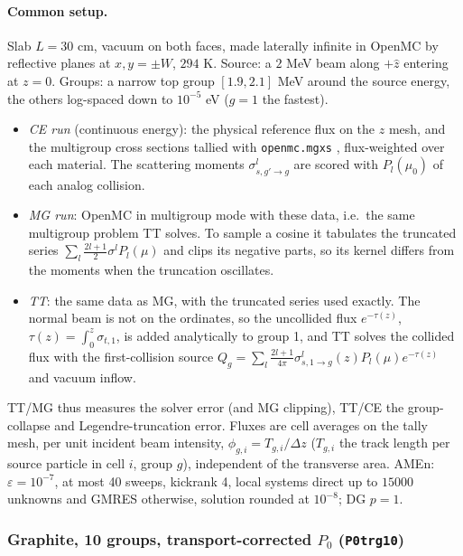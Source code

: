 \documentclass[11pt,a4paper]{article}
\newcommand{\code}[1]{\texttt{#1}}
\begin{document}
\paragraph{Common setup.} Slab $L=30$ cm, vacuum on both faces, made laterally infinite in OpenMC by reflective planes at $x,y=\pm W$, $294$ K. Source: a $2$ MeV beam along $+\hat z$ entering at $z=0$. Groups: a narrow top group $[1.9,2.1]$ MeV around the source energy, the others log-spaced down to $10^{-5}$ eV ($g=1$ the fastest).
\begin{itemize}[nosep]
\item \emph{CE run} (continuous energy): the physical reference flux on the $z$ mesh, and the multigroup cross sections tallied with \code{openmc.mgxs} \cite{MGXS}, flux-weighted over each material. The scattering moments $\sigma^l_{s,g'\to g}$ are scored with $P_l(\mu_0)$ of each analog collision.
\item \emph{MG run}: OpenMC in multigroup mode with these data, i.e.\ the same multigroup problem TT solves. To sample a cosine it tabulates the truncated series $\sum_l\frac{2l+1}{2}\sigma^lP_l(\mu)$ and clips its negative parts, so its kernel differs from the moments when the truncation oscillates.
\item \emph{TT}: the same data as MG, with the truncated series used exactly. The normal beam is not on the ordinates, so the uncollided flux $e^{-\tau(z)}$, $\tau(z)=\int_0^z\sigma_{t,1}$, is added analytically to group 1, and TT solves the collided flux with the first-collision source $Q_g=\sum_l\frac{2l+1}{4\pi}\sigma^{l}_{s,1\to g}(z)P_l(\mu)e^{-\tau(z)}$ and vacuum inflow.
\end{itemize}
TT/MG thus measures the solver error (and MG clipping), TT/CE the group-collapse and Legendre-truncation error. Fluxes are cell averages on the tally mesh, per unit incident beam intensity, $\phi_{g,i}=T_{g,i}/\Delta z$ ($T_{g,i}$ the track length per source particle in cell $i$, group $g$), independent of the transverse area. AMEn: $\varepsilon=10^{-7}$, at most 40 sweeps, kickrank 4, local systems direct up to $15000$ unknowns and GMRES otherwise, solution rounded at $10^{-8}$; DG $p=1$.

\subsubsection{Graphite, 10 groups, transport-corrected \texorpdfstring{$P_0$}{P0} (\texttt{P0trg10})}
\end{document}
